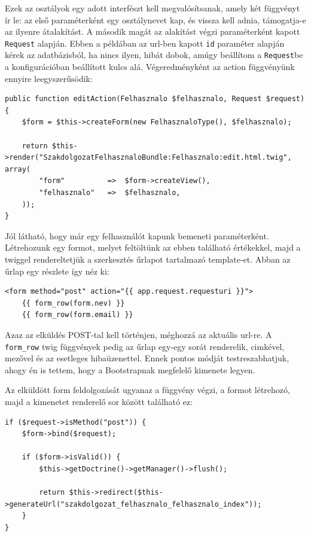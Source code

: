 \documentclass[a4paper,12pt,oneside]{report}
\begin{document}
Ezek az osztályok egy adott interfészt kell megvalósítsanak, amely két függvényt ír le: az első paraméterként egy osztálynevet kap, és vissza kell adnia, támogatja-e az ilyenre átalakítást. A második magát az alakítást végzi paraméterként kapott {\tt Request} alapján. Ebben a példában az url-ben kapott {\tt id} paraméter alapján kérek az adatbázisból, ha nincs ilyen, hibát dobok, amúgy beállítom a {\tt Request}be a konfigurációban beállított kulcs alá. Végeredményként az action függvényünk ennyire leegyszerűsödik:

\begin{lstlisting}
public function editAction(Felhasznalo $felhasznalo, Request $request)
{
    $form = $this->createForm(new FelhasznaloType(), $felhasznalo);

    return $this->render("SzakdolgozatFelhasznaloBundle:Felhasznalo:edit.html.twig", array(
        "form"          =>  $form->createView(),
        "felhasznalo"   =>  $felhasznalo,
    ));
}
\end{lstlisting}

Jól látható, hogy már egy felhasználót kapunk bemeneti paraméterként. Létrehozunk egy formot, melyet feltöltünk az ebben található értékekkel, majd a twiggel rendereltetjük a szerkesztés űrlapot tartalmazó template-et. Abban az űrlap egy részlete így néz ki:

\begin{lstlisting}
<form method="post" action="{{ app.request.requesturi }}">
    {{ form_row(form.nev) }}
    {{ form_row(form.email) }}
\end{lstlisting}

Azaz az elküldés POST-tal kell történjen, méghozzá az aktuális url-re. A {\tt form\_row} twig függvények pedig az űrlap egy-egy sorát renderelik, cimkével, mezővel és az esetleges hibaüzenettel. Ennek pontos módját testreszabhatjuk, ahogy én is tettem, hogy a Bootstrapnak megfelelő kimenete legyen.

Az elküldött form feldolgozását ugyanaz a függvény végzi, a formot létrehozó, majd a kimenetet renderelő sor között található ez:

\begin{lstlisting}
if ($request->isMethod("post")) {
    $form->bind($request);

    if ($form->isValid()) {
        $this->getDoctrine()->getManager()->flush();

        return $this->redirect($this->generateUrl("szakdolgozat_felhasznalo_felhasznalo_index"));
    }
}
\end{lstlisting}
\end{document}
